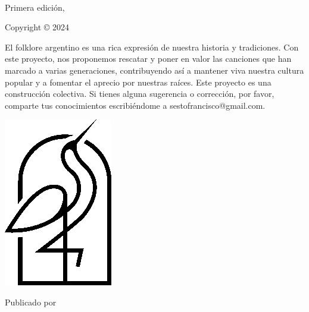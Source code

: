 
{\small
\setlength{\parindent}{0em}\setlength{\parskip}{1em}
~
\vfill

Primera edición, \editionyear{}

Copyright \copyright{} 2024 \authorname

El folklore argentino es una rica expresión de nuestra historia y tradiciones. Con este proyecto, nos proponemos rescatar y poner en valor las canciones que han marcado a varias generaciones, contribuyendo así a mantener viva nuestra cultura popular y a fomentar el aprecio por nuestras raíces. Este proyecto es una construcción colectiva. Si tienes alguna sugerencia o corrección, por favor, comparte tus conocimientos escribiéndome a sestofrancisco@gmail.com.

\ifx\isbn\undefined\else\if\relax\detokenize\expandafter{\isbn}\relax{}\fi\fi

\includegraphics[width=0.07\linewidth]{frontmatter/logo-black.png}

Publicado por \publisher{}
}
